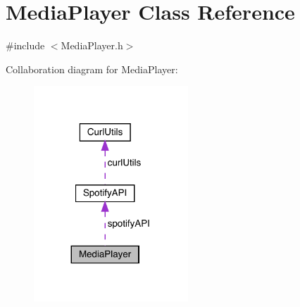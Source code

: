 \hypertarget{class_media_player}{}\section{Media\+Player Class Reference}
\label{class_media_player}


{\ttfamily \#include $<$Media\+Player.\+h$>$}



Collaboration diagram for Media\+Player\+:
\nopagebreak
\begin{figure}[H]
\begin{center}
\leavevmode
\includegraphics[width=164pt]{class_media_player__coll__graph}
\end{center}
\end{figure}
